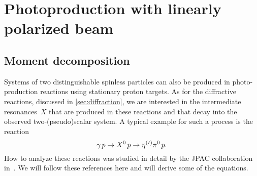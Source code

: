 \section{Photoproduction with linearly polarized beam}%
\label{sec:photoprod}

\subsection{Moment decomposition}%
\label{sec:photoprod:moment}

Systems of two distinguishable spinless particles can also be produced
in photo-production reactions using stationary proton targets.  As for
the diffractive reactions, discussed in \cref{sec:diffraction}, we are
interested in the intermediate resonances~$X$ that are produced in
these reactions and that decay into the observed two-(pseudo)scalar
system.  A typical example for such a process is the reaction
\begin{equation}
  \gamma\, p \to X^0\, p \to \etaOrPr\pi^0\, p.
\end{equation}
How to analyze these reactions was studied in detail by the JPAC
collaboration in~.  We will
follow these references here and will derive some of the
equations.

